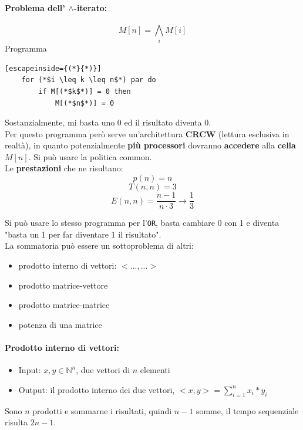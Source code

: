 \documentclass[11pt]{article}
\begin{document}
	\newpage
	
	\paragraph{Problema dell' $\wedge$-iterato:}
	$$ M[n] = \bigwedge_i M[i] $$
	Programma
	\begin{lstlisting}[escapeinside={(*}{*)}]
	for (*$i \leq k \leq n$*) par do 
		if M[(*$k$*)] = 0 then
			M[(*$n$*)] = 0
	\end{lstlisting}
	
	Sostanzialmente, mi basta uno 0 ed il risultato diventa 0.\\
	
	Per questo programma però serve un'architettura \textbf{CRCW} (lettura esclusiva in realtà), in quanto potenzialmente \textbf{più processori} dovranno \textbf{accedere} alla \textbf{cella} $M[n]$. Si può usare la politica common.\\
	
	Le \textbf{prestazioni} che ne risultano: 
	$$ p(n) = n $$
	$$ T(n,n) = 3 $$
	$$ E(n,n) = \frac{n-1}{n \cdot 3} \rightarrow \frac{1}{3} $$
	
	Si può usare lo stesso programma per l'\texttt{OR}, basta cambiare 0 con 1 e diventa "basta un 1 per far diventare 1 il risultato".\\
	
	La sommatoria può essere un sottoproblema di altri: 
	\begin{itemize}
		\item prodotto interno di vettori: $<... , ...>$ 
		\item prodotto matrice-vettore
		\item prodotto matrice-matrice
		\item potenza di una matrice
	\end{itemize}
	
	\newpage
	
	\paragraph{Prodotto interno di vettori:}
	\begin{itemize}
		\item Input: $x,y \in \mathbb{N}^n$, due vettori di $n$ elementi
		\item Output: il prodotto interno dei due vettori, $<x,y> = \sum_{i=1}^n x_i \ast y_i$
	\end{itemize}
	Sono $n$ prodotti e sommarne i risultati, quindi $n-1$ somme, il tempo sequenziale risulta $2n-1$.\\
	
\end{document}
